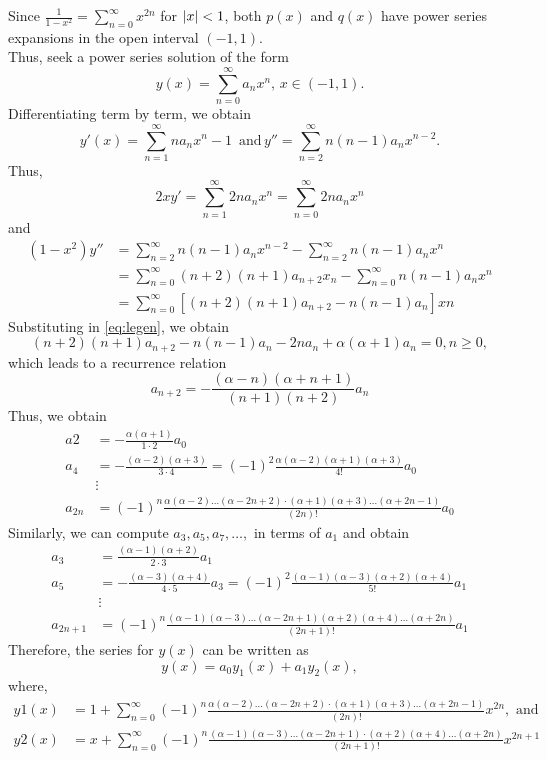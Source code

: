 \documentclass[../main-sheet.tex]{subfiles}
\begin{document}
Since $\frac{1}{1-x^2}=\sum_{n=0}^\infty x^{2n}  $ for $ \left\vert x\right\vert < 1 $, both $ p(x ) $ and $ q(x ) $ have power series expansions in the open interval $ (-1, 1) $.\\
Thus, seek a power series solution of the form
\[
    y (x ) =\sum_{n=0}^\infty	a_n x^n,\, x \in (-1, 1).
\]
Differentiating term by term, we obtain
\[
    y'(x ) = \sum_{n=1}^\infty n a_n x^n-1 \, \text{ and}\, y'' =\sum_{n=2}^\infty n(n - 1)a_nx^{n-2}.
\]
Thus,
\[
    2xy'= \sum_{n=1}^\infty 2na_nx^n = \sum_{n=0}^\infty 2na_nx^n
\]
and
\begin{align*}
    (1 - x^2)y''&=\sum_{n=2}^\infty n(n - 1)a_nx^{n-2} - \sum_{n=2}^\infty n(n - 1)a_nx^n\\
    &=\sum_{n=0}^\infty (n + 2)(n + 1)a_{n+2}x_n - \sum_{n=0}^\infty n(n - 1)a_nx^n\\
    &=\sum_{n=0}^\infty \left[(n + 2)(n + 1)a_{n+2} - n(n - 1)a_n\right]xn
\end{align*}
Substituting in \eqref{eq:legen}, we obtain
\[
    (n +2)(n +1)a_{n+2} -n(n-1)a_n -2na_n +\alpha(\alpha+1)a_n = 0, n \geq 0, 
\]
which leads to a recurrence relation
\[
    a_{n+2}=-\frac{(\alpha-n)(\alpha+n+1)}{(n+1)(n+2)}a_n
\]
Thus, we obtain
\begin{align*}
    a2	&=-\frac{\alpha(\alpha+1)}{1\cdot 2}a_0\\
    a_4&=-\frac{(\alpha-2)(\alpha + 3)}{3\cdot4}=(-1)^2\frac{\alpha(\alpha-2)(\alpha + 1)(\alpha + 3)}{4!}a_0\\
    &\vdots\\
    a_{2n}&=(-1)^n\frac{\alpha(\alpha - 2)\dots (\alpha - 2n + 2) \cdot (\alpha + 1)(\alpha + 3) \dots (\alpha + 2n - 1)}{(2n)!}a_0
\end{align*}
Similarly, we can compute $ a_3, a_5, a_7,\dots, $ in terms of $ a_1 $ and obtain
\begin{align*}
    a_3&=\frac{(\alpha-1)(\alpha + 2)}{2\cdot3}a_1\\
    a_5&=-\frac{(\alpha-3)(\alpha + 4)}{4\cdot5}a_3=(-1)^2\frac{(\alpha-1)(\alpha-3)(\alpha + 2)(\alpha + 4)}{5!}a_1\\
    &\vdots\\
    a_{2n+1}&=(-1)^n\frac{(\alpha-1)(\alpha-3)\dots(\alpha - 2n + 1)(\alpha + 2)(\alpha + 4)\dots(\alpha + 2n)}{(2n + 1)!}a_1
\end{align*}
Therefore, the series for $ y (x ) $ can be written as
\[
    y (x ) = a_0y_1(x ) + a_1y_2(x ),
\]
where,
\begin{align*}
    y1(x ) &= 1 +\sum_{n=0}^\infty(-1)^n\frac{\alpha(\alpha-2)\dots(\alpha-2n+2)\cdot(\alpha+1)(\alpha+3)\dots(\alpha+2n-1)}{(2n)!}x^{2n},\text{ and}\\ 
    y2(x ) &= x + \sum_{n=0}^\infty(-1)^n\frac{(\alpha-1)(\alpha-3)\dots(\alpha-2n+1)\cdot(\alpha+2)(\alpha+4)\dots(\alpha+2n)}{(2n+1)!}x^{2n+1}
\end{align*}
\end{document}
